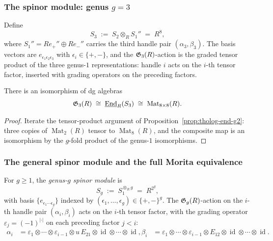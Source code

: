 \subsubsection{The spinor module: genus $g = 3$}

\begin{definition}
Define
\[
S_3 \;:=\; S_2 \otimes_R S_1''
\;=\; R^8,
\]
where $S_1'' = R e_+'' \oplus R e_-''$ carries the third handle
pair $(\alpha_3, \beta_3)$.
The basis vectors are
$e_{\epsilon_1\epsilon_2\epsilon_3}$ with
$\epsilon_i \in \{+,-\}$, and the $\mathfrak{G}_3(R)$-action is the
graded tensor product of the three genus-$1$ representations:
handle $i$ acts on the $i$-th tensor factor, inserted with
grading operators on the preceding factors.
\end{definition}

\begin{proposition}
There is an isomorphism of dg algebras
\[
\mathfrak{G}_3(R)
\;\cong\;
\underline{\operatorname{End}}_R(S_3)
\;\cong\;
\operatorname{Mat}_{8 \times 8}(R).
\]
\end{proposition}

\begin{proof}
Iterate the tensor-product argument of
Proposition~\ref{prop:tholog-end-g2}: three copies of
$\operatorname{Mat}_2(R)$ tensor to $\operatorname{Mat}_8(R)$,
and the composite map is an isomorphism by the
$g$-fold product of the genus-$1$ isomorphisms.
\end{proof}

\subsubsection{The general spinor module and the full Morita equivalence}

\begin{definition}
For $g \geq 1$, the \emph{genus-$g$ spinor module} is
\[
S_g \;:=\; S_1^{\otimes_R g}
\;=\;
R^{2^g},
\]
with basis $\{e_{\epsilon_1 \cdots \epsilon_g}\}$
indexed by $(\epsilon_1,\dots,\epsilon_g) \in \{+,-\}^g$.
The $\mathfrak{G}_g(R)$-action on the $i$-th handle pair
$(\alpha_i, \beta_i)$ acts on the $i$-th tensor factor,
with the grading operator $\varepsilon_j = (-1)^{|\cdot|}$
on each preceding factor $j < i$:
\begin{align}
\alpha_i &= \varepsilon_1 \otimes \cdots \otimes \varepsilon_{i-1}
\otimes u\,E_{21} \otimes \operatorname{id} \otimes \cdots \otimes
\operatorname{id},
\beta_i &= \varepsilon_1 \otimes \cdots \otimes \varepsilon_{i-1}
\otimes E_{12} \otimes \operatorname{id} \otimes \cdots \otimes
\operatorname{id}.
\end{align}
\end{definition}

